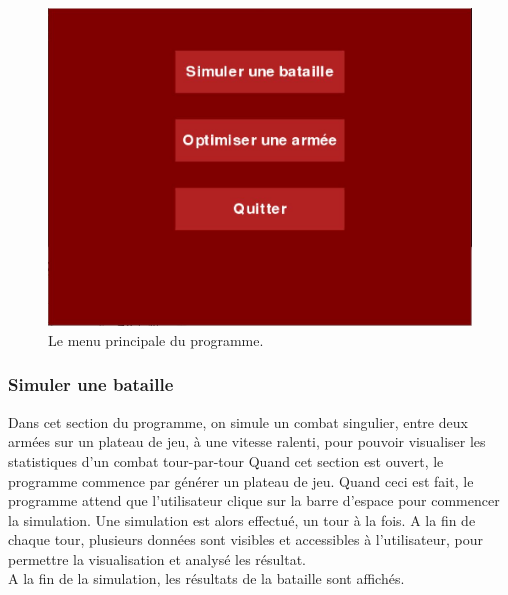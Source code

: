\documentclass[a4paper, 11pt]{article}
\begin{document}
\begin{figure}[!htbp]

\begin{center}

\includegraphics[scale=0.3]{Menu}
\caption{Le menu principale du programme.}

\end{center}

\end{figure}

\subsubsection{Simuler une bataille}

Dans cet section du programme, on simule un combat singulier, entre deux armées sur un plateau de jeu, à une vitesse ralenti, pour pouvoir visualiser les statistiques d'un combat tour-par-tour
Quand cet section est ouvert, le programme commence par générer un plateau de jeu. Quand ceci est fait, le programme attend que l'utilisateur clique sur la barre d'espace pour commencer la simulation.
Une simulation est alors effectué, un tour à la fois. A la fin de chaque tour, plusieurs données sont visibles et accessibles à l'utilisateur, pour permettre la visualisation et analysé les résultat. \\
A la fin de la simulation, les résultats de la bataille sont affichés.
\end{document}
